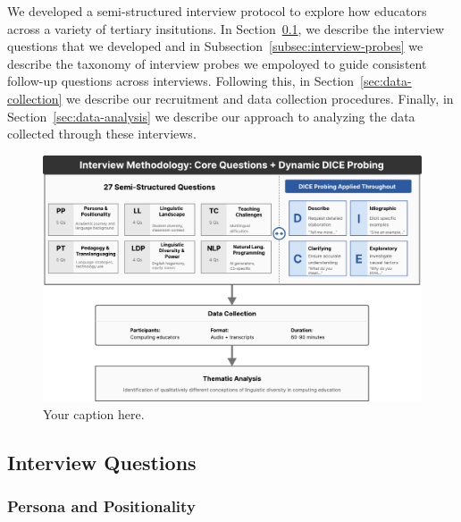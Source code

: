 We developed a semi-structured interview protocol to explore how educators
across a variety of tertiary insitutions. In
Section~\ref{subsec:interview-questions}, we describe the interview questions
that we developed and in Subsection~\ref{subsec:interview-probes} we describe
the taxonomy of interview probes we empoloyed to guide consistent follow-up
questions across interviews. Following this, in
Section~\ref{sec:data-collection} we describe our recruitment and data
collection procedures. Finally, in Section~\ref{sec:data-analysis} we describe
our approach to analyzing the data collected through these interviews.

\begin{figure}[ht]
  \centering
  \includegraphics[width=\textwidth]{imgs/methods.pdf}
  \caption{Your caption here.}
  \label{fig:methods}
\end{figure}


\subsection{Interview Questions}\label{subsec:interview-questions}

\subsubsection{Persona and Positionality}\label{subsubsec:persona-and-positionality}

